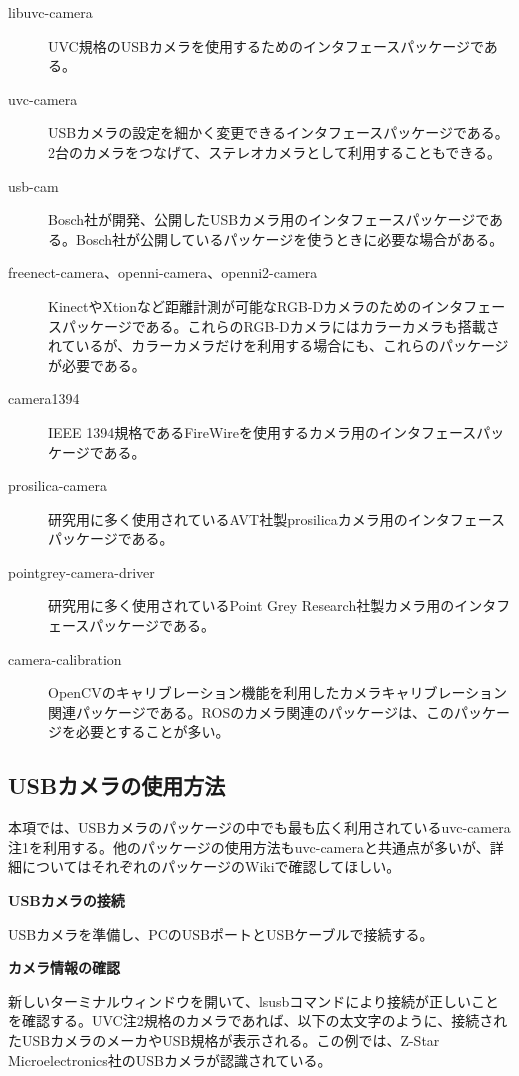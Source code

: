 \vspace{\baselineskip}
\noindent
\begin{description}
\item[libuvc-camera] UVC規格のUSBカメラを使用するためのインタフェースパッケージである。
\item[uvc-camera] USBカメラの設定を細かく変更できるインタフェースパッケージである。2台のカメラをつなげて、ステレオカメラとして利用することもできる。
\item[usb-cam] Bosch社が開発、公開したUSBカメラ用のインタフェースパッケージである。Bosch社が公開しているパッケージを使うときに必要な場合がある。
\item[freenect-camera、openni-camera、openni2-camera] KinectやXtionなど距離計測が可能なRGB-Dカメラのためのインタフェースパッケージである。これらのRGB-Dカメラにはカラーカメラも搭載されているが、カラーカメラだけを利用する場合にも、これらのパッケージが必要である。
\item[camera1394] IEEE 1394規格であるFireWireを使用するカメラ用のインタフェースパッケージである。
\item[prosilica-camera] 研究用に多く使用されているAVT社製prosilicaカメラ用のインタフェースパッケージである。
\item[pointgrey-camera-driver] 研究用に多く使用されているPoint Grey Research社製カメラ用のインタフェースパッケージである。
\item[camera-calibration] OpenCVのキャリブレーション機能を利用したカメラキャリブレーション関連パッケージである。ROSのカメラ関連のパッケージは、このパッケージを必要とすることが多い。
\end{description}

\subsection{USBカメラの使用方法}

本項では、USBカメラのパッケージの中でも最も広く利用されているuvc-camera注1を利用する。他のパッケージの使用方法もuvc-cameraと共通点が多いが、詳細についてはそれぞれのパッケージのWikiで確認してほしい。

\textbf{USBカメラの接続}

USBカメラを準備し、PCのUSBポートとUSBケーブルで接続する。

\textbf{カメラ情報の確認}

新しいターミナルウィンドウを開いて、lsusbコマンドにより接続が正しいことを確認する。UVC注2規格のカメラであれば、以下の太文字のように、接続されたUSBカメラのメーカやUSB規格が表示される。この例では、Z-Star Microelectronics社のUSBカメラが認識されている。


